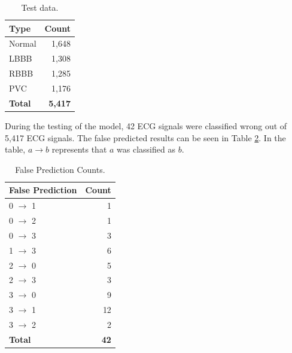 \renewcommand{\arraystretch}{2}
\begin{table}
	\caption{Test data.} \label{tab:test_count}
	
	\begin{center}
		\begin{tabular}{ | l | r | }
			\hline
			\textbf{Type} & \textbf{Count} \\ \hline
			Normal & 1,648 \\ \hline
			LBBB  & 1,308  \\ \hline
			RBBB  & 1,285  \\ \hline
			PVC  & 1,176  \\ \hline
			\textbf{Total}  & \textbf{5,417}  \\ \hline
		\end{tabular}
	\end{center}
	
\end{table}

During the testing of the model, 42 ECG signals were classified wrong out of 5,417 ECG signals. The false predicted results can be seen in Table \ref{tab:false_pred_count}. In the table, $a \rightarrow b$ represents that $a$ was classified as $b$.


\renewcommand{\arraystretch}{2}
\begin{table}
	\caption{False Prediction Counts.} \label{tab:false_pred_count}
	
	\begin{center}
		\begin{tabular}{ | l | r | }
			\hline
			\textbf{False Prediction} & \textbf{Count} \\ \hline
			0 $\rightarrow$ 1  & 1   \\ \hline
			0 $\rightarrow$ 2  & 1  \\ \hline
			0 $\rightarrow$ 3  & 3  \\ \hline
			1 $\rightarrow$ 3  & 6  \\ \hline
			2 $\rightarrow$ 0  & 5  \\ \hline
			2 $\rightarrow$ 3  & 3  \\ \hline
			3 $\rightarrow$ 0  & 9  \\ \hline
			3 $\rightarrow$ 1  & 12 \\ \hline
			3 $\rightarrow$ 2  & 2  \\ \hline
			\textbf{Total}   & \textbf{42}  \\ \hline
		\end{tabular}
	\end{center}
	
\end{table}